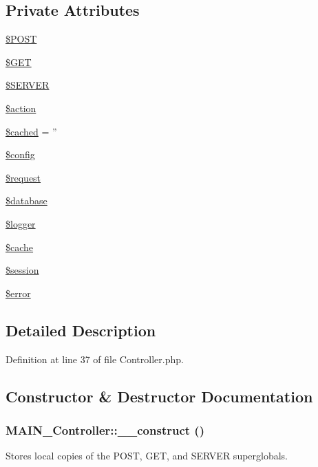 \subsection*{Private Attributes}
\begin{DoxyCompactItemize}
\item 
\hyperlink{classMAIN__Controller_a340814c812daea328ea667392bf3dbac}{\$POST}
\item 
\hyperlink{classMAIN__Controller_aa072e0fbed2a55683b79b6051898b405}{\$GET}
\item 
\hyperlink{classMAIN__Controller_a95325660c51e8672302c6ddfe8df58c2}{\$SERVER}
\item 
\hyperlink{classMAIN__Controller_a586f25bf8bda47c77b6a66a5f2d0d68f}{\$action}
\item 
\hyperlink{classMAIN__Controller_acc4c62c1bdc82257bfab216245c3ba98}{\$cached} = ''
\item 
\hyperlink{classMAIN__Controller_a2aca1668ade4cd033ab1376fe5ce3641}{\$config}
\item 
\hyperlink{classMAIN__Controller_aeb53199b16ee35291df91c7cc97148a7}{\$request}
\item 
\hyperlink{classMAIN__Controller_ace18fc24f51944c19682bffe09603f97}{\$database}
\item 
\hyperlink{classMAIN__Controller_a7fa8fc6630663c9024016edbba1f9fa5}{\$logger}
\item 
\hyperlink{classMAIN__Controller_ad9dbd5184b193cbea96bd88eadd88059}{\$cache}
\item 
\hyperlink{classMAIN__Controller_ac0e517c6f06f9cefa0c6e52ce0a6247a}{\$session}
\item 
\hyperlink{classMAIN__Controller_afc211a153cde6633f13d1797ceab6adb}{\$error}
\end{DoxyCompactItemize}


\subsection{Detailed Description}


Definition at line 37 of file Controller.php.

\subsection{Constructor \& Destructor Documentation}
\hypertarget{classMAIN__Controller_af1465bb574b9238d78d1b0172fb5249e}{
\subsubsection[{\_\-\_\-construct}]{\setlength{\rightskip}{0pt plus 5cm}MAIN\_\-Controller::\_\-\_\-construct ()}}
\label{d0/d6f/classMAIN__Controller_af1465bb574b9238d78d1b0172fb5249e}
Stores local copies of the POST, GET, and SERVER superglobals. 

